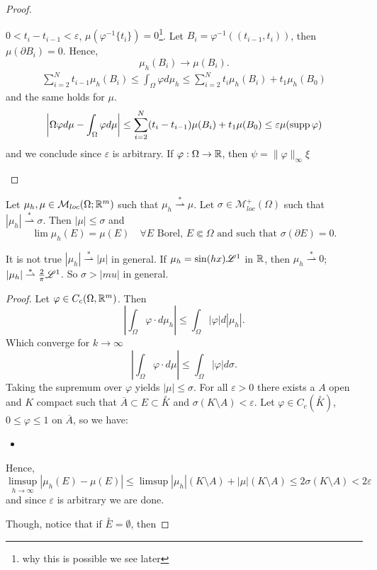\begin{proof}
\begin{enumerate}[(1)]
$0 < t_i - t_{i-1} < \varepsilon$, $\mu(\varphi^{-1}\{t_i\}) = 0$\footnote{why
this is possible we see later}.
Let $B_i = \varphi^{-1}((t_{i-1},t_i))$, then $\mu(\partial B_i) = 0$. Hence,
\[
\mu_h(B_i) \to \mu(B_i).
\]
\[
\begin{aligned}
\sum_{i=2}^N t_{i-1}\mu_h(B_i) \leq \int_\Omega \varphi d\mu_h
\leq \sum_{i=2}^N t_i \mu_h (B_i) +t_1\mu_h(B_0)
\end{aligned}
\]
and the same holds for $\mu$.
\[
\left|\Omega \varphi d\mu - \int_\Omega \varphi d\mu\right| \leq 
\sum_{i=2}^N(t_i - t_{i-1}) \mu(B_i) + t_1 \mu(B_0)
\leq \varepsilon \mu(\operatorname{supp} \varphi)
\]
and we conclude since $\varepsilon$ is arbitrary.
If $\varphi : \Omega\to \mathbb{R}$, then $\psi = \|\varphi\|_\infty \xi$
\end{enumerate}
\end{proof}

\newcommand{\weakstar}{\stackrel {*}{\rightharpoonup}}

\begin{proposition}
Let $\mu_h, \mu \in \mathcal{M}_{loc}(\Omega; \mathbb{R}^m)$ such that $\mu_h \weakstar
\mu$. Let $\sigma \in \mathcal{M}^+_{loc}(\Omega)$ such that $|\mu_h| \weakstar
\sigma$. Then $|\mu| \leq \sigma$ and 
\[
\lim \mu_h(E) = \mu(E) \quad 
\text{$\forall E$ Borel, $E \Subset \Omega$ and such that $\sigma(\partial E) =
0$.}
\]
\end{proposition}

\begin{remark}
It is not true $|\mu_h| \weakstar |\mu|$ in general. If $\mu_h = \sin(hx)
\mathscr{L}^{1}$ in $\mathbb{R}$, then $\mu_h \weakstar 0$; $|\mu_h| \weakstar \frac{2}{\pi}
\Leb{1}$. So $\sigma > |mu|$ in general.
\end{remark}

\begin{proof}
Let $\varphi \in C_c(\Omega,\mathbb{R}^m)$. Then 
\[
\left|\int_\Omega \varphi \cdot d\mu_h \right| \leq \int_\Omega |\varphi|
d|\mu_h|.
\]
Which converge for $k\to \infty$
\[
\left|\int_\Omega \varphi \cdot d\mu \right| \leq \int_\Omega |\varphi|
d\sigma.
\]
Taking the supremum over $\varphi$ yields $|\mu| \leq \sigma$.
For all $\varepsilon >0$ there exists a $A$ open and $K$ compact such that
$\overline{A} \subset E \subset \overset{\circ}{K}$ and $\sigma (K \setminus A)
< \varepsilon$. Let $\varphi \in C_c(\overset{\circ}{K})$, $0 \leq \varphi \leq
1$ on $\overline {A}$, so we have:
\begin{itemize}[]
\item \TODO
\end{itemize}
Hence, 
\[
\limsup_{h\to \infty} |\mu_h(E) - \mu(E)| \leq \limsup |\mu_h|(K\setminus A) +
|\mu|(K\setminus A)
\leq 2\sigma(K\setminus A) < 2\varepsilon
\]
and since $\varepsilon$ is arbitrary we are done.

Though, notice that if $\overset{\circ}{E} = \emptyset$, then \TODO
\end{proof}

